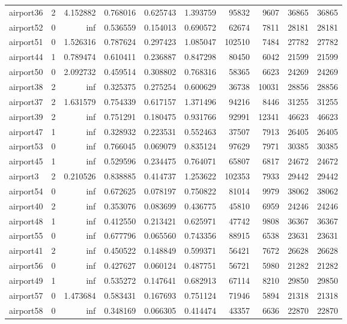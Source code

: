 \begin{longtable}{|l|r|r|r|r|r|r|r|r|r|}
airport36 & 2 & 4.152882 & 0.768016 & 0.625743 & 1.393759 & 95832 & 9607 & 36865 & 36865 \\
airport52 & 0 & inf & 0.536559 & 0.154013 & 0.690572 & 62674 & 7811 & 28181 & 28181 \\
airport51 & 0 & 1.526316 & 0.787624 & 0.297423 & 1.085047 & 102510 & 7484 & 27782 & 27782 \\
airport44 & 1 & 0.789474 & 0.610411 & 0.236887 & 0.847298 & 80450 & 6042 & 21599 & 21599 \\
airport50 & 0 & 2.092732 & 0.459514 & 0.308802 & 0.768316 & 58365 & 6623 & 24269 & 24269 \\
airport38 & 2 & inf & 0.325375 & 0.275254 & 0.600629 & 36738 & 10031 & 28856 & 28856 \\
airport37 & 2 & 1.631579 & 0.754339 & 0.617157 & 1.371496 & 94216 & 8446 & 31255 & 31255 \\
airport39 & 2 & inf & 0.751291 & 0.180475 & 0.931766 & 92991 & 12341 & 46623 & 46623 \\
airport47 & 1 & inf & 0.328932 & 0.223531 & 0.552463 & 37507 & 7913 & 26405 & 26405 \\
airport53 & 0 & inf & 0.766045 & 0.069079 & 0.835124 & 97629 & 7971 & 30385 & 30385 \\
airport45 & 1 & inf & 0.529596 & 0.234475 & 0.764071 & 65807 & 6817 & 24672 & 24672 \\
airport3 & 2 & 0.210526 & 0.838885 & 0.414737 & 1.253622 & 102353 & 7933 & 29442 & 29442 \\
airport54 & 0 & inf & 0.672625 & 0.078197 & 0.750822 & 81014 & 9979 & 38062 & 38062 \\
airport40 & 2 & inf & 0.353076 & 0.083699 & 0.436775 & 45810 & 6959 & 24246 & 24246 \\
airport48 & 1 & inf & 0.412550 & 0.213421 & 0.625971 & 47742 & 9808 & 36367 & 36367 \\
airport55 & 0 & inf & 0.677796 & 0.065560 & 0.743356 & 88915 & 6538 & 23631 & 23631 \\
airport41 & 2 & inf & 0.450522 & 0.148849 & 0.599371 & 56421 & 7672 & 26628 & 26628 \\
airport56 & 0 & inf & 0.427627 & 0.060124 & 0.487751 & 56721 & 5980 & 21282 & 21282 \\
airport49 & 1 & inf & 0.535272 & 0.147641 & 0.682913 & 67114 & 8210 & 29850 & 29850 \\
airport57 & 0 & 1.473684 & 0.583431 & 0.167693 & 0.751124 & 71946 & 5894 & 21318 & 21318 \\
airport58 & 0 & inf & 0.348169 & 0.066305 & 0.414474 & 43357 & 6636 & 22870 & 22870 \\

\end{longtable}

